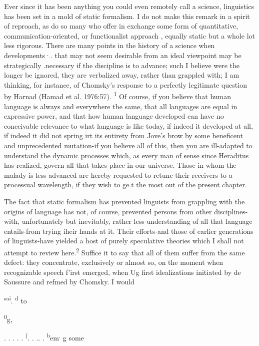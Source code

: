 Ever since it has been anything you could even remotely call a science, linguistics has been set in a mold of static formalism. I do not make this remark in a spirit of reproach, as do so many who offer in exchange some form of quantitative, communication-oriented, or functionalist approach , equally static but a whole lot less rigorous. There are many points in the history of a science when developments·. that may not seem desirable from an ideal viewpoint may be strategi\-cally .necessary if the discipline is to advance; such I believe were the
longer be ignored, they are verbalized away, rather than grappled with; I am thinking, for instance, of Chomsky's response to a perfectly legitimate question by Harnad (Hamad et al. 1976:57). \textsuperscript{1} Of course, if you believe that human language is always and everywhere tbe same, that all languages are equal in expressive power, and that how human language developed can have no conceivable relevance to what language is like today, if indeed it developed at all, if indeed it did not spring irt its entirety from Jove's brow by some beneficent and unprecedented mutation-if you believe all of this, then you are ill-adapted to under\-stand the dynamic processes which, as every man of sense since Hera\-ditus has realized, govern all that takes place in our universe. Those in whom the malady is less advanced are hereby requested to retune their receivers to a processual wavelength, if they wish to ge.t the most out of the present chapter.

The fact that static formalism has prevented linguists from grappling with the origins of language has not, of course, prevented persons from other disciplines-with, unfortunately but inevitably, rather less understanding of all that language entails-from trying iheir hands at it. Their efforts-and those of earlier generations of linguists-have yielded a host of purely speculative theories which I shall not attempt to review here.\textsuperscript{2} Suffice it to say that all of them suffer from the same defect: they concentrate, exclusively or almost so, on the moment when recognizable speech f'irst emerged, when Ug first
idealizations initiated by de Saussure and refmed by Chomsky. I would

\textsuperscript{sa}\textsuperscript{i}. \textsuperscript{d} to

\textsuperscript{0}g,

\textsuperscript{{\textquotedbl}}. . . . .\textsuperscript{{\textquotedbl}} \textsuperscript{(}\textsuperscript{{\textquotedbl}}. . .. .\textsuperscript{{\textquotedbl}} \textsuperscript{b}em\textsuperscript{.} g some

